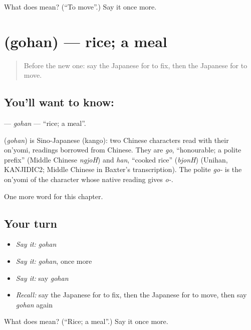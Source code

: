 \begin{tcolorbox}[breakable,colback=teal!4,colframe=teal!35!black,title={Before you move on}]
What does  mean? (\textquotedblleft{}To move\textquotedblright{}.) Say it once more.
\end{tcolorbox}
\section[\texorpdfstring{\ja{ごはん} (gohan)}{ごはん (gohan)}]{ (gohan) — rice; a meal}

\label{lesson:JA-C31-gohan}



\begin{quote}
Before the new one: say the Japanese for to fix, then the Japanese for to move.
\end{quote}

\subsection*{You'll want to know: }
\textbf{} — \emph{gohan} — \textquotedblleft{}rice; a meal\textquotedblright{}.

\begin{cousinweb}
\textbf{} (\emph{gohan}) is Sino-Japanese (kango): two Chinese characters read with their on'yomi, readings borrowed from Chinese. They are \emph{go}, \textquotedblleft{}honourable; a polite prefix\textquotedblright{} (Middle Chinese \emph{ngjoH}) and \emph{han}, \textquotedblleft{}cooked rice\textquotedblright{} (\emph{bjonH}) (Unihan, KANJIDIC2; Middle Chinese in Baxter's transcription). The polite \emph{go-} is the on'yomi of the character whose native reading gives \emph{o-}.
\end{cousinweb}

\begin{grammarlens}[title={What you've built}]
One more word for this chapter.
\end{grammarlens}

\subsection*{Your turn}
\begin{itemize}
\raggedright
  \item \emph{Say it:} \emph{gohan}
  \item \emph{Say it:} \emph{gohan}, once more
  \item \emph{Say it:} say \emph{gohan}
  \item \emph{Recall:} say the Japanese for to fix, then the Japanese for to move, then say \emph{gohan} again
\end{itemize}

\begin{tcolorbox}[breakable,colback=teal!4,colframe=teal!35!black,title={Before you move on}]
What does  mean? (\textquotedblleft{}Rice; a meal\textquotedblright{}.) Say it once more.
\end{tcolorbox}
